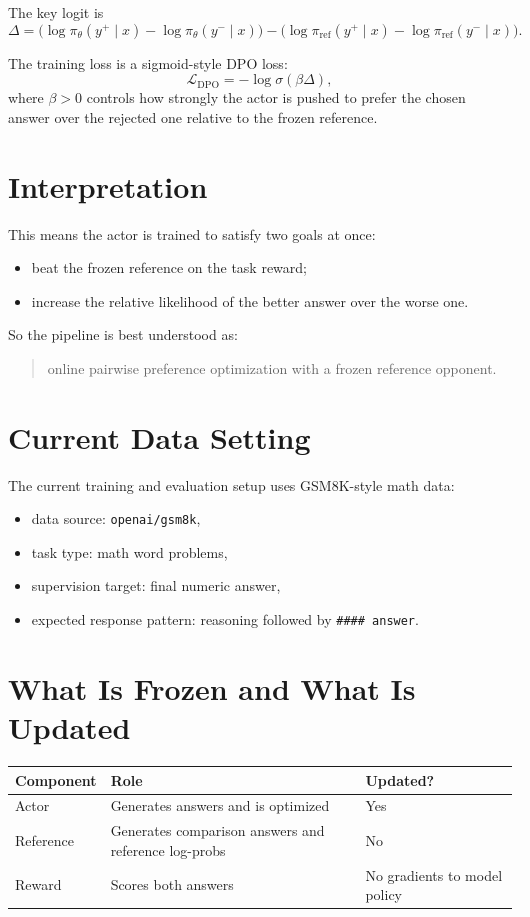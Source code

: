 \documentclass[11pt]{article}
\begin{document}
The key logit is
\[
\Delta =
\bigl(\log \pi_{\theta}(y^{+}\mid x) - \log \pi_{\theta}(y^{-}\mid x)\bigr)
-
\bigl(\log \pi_{\mathrm{ref}}(y^{+}\mid x) - \log \pi_{\mathrm{ref}}(y^{-}\mid x)\bigr).
\]

The training loss is a sigmoid-style DPO loss:
\[
\mathcal{L}_{\mathrm{DPO}}
=
- \log \sigma(\beta \Delta),
\]
where $\beta > 0$ controls how strongly the actor is pushed to prefer the
chosen answer over the rejected one relative to the frozen reference.

\section{Interpretation}

This means the actor is trained to satisfy two goals at once:
\begin{itemize}
  \item beat the frozen reference on the task reward;
  \item increase the relative likelihood of the better answer over the worse one.
\end{itemize}

So the pipeline is best understood as:
\begin{quote}
online pairwise preference optimization with a frozen reference opponent.
\end{quote}

\section{Current Data Setting}

The current training and evaluation setup uses GSM8K-style math data:
\begin{itemize}
  \item data source: \texttt{openai/gsm8k},
  \item task type: math word problems,
  \item supervision target: final numeric answer,
  \item expected response pattern: reasoning followed by \texttt{\#\#\#\# answer}.
\end{itemize}

\section{What Is Frozen and What Is Updated}

\begin{center}
\begin{tabular}{lll}
\toprule
Component & Role & Updated? \\
\midrule
Actor & Generates answers and is optimized & Yes \\
Reference & Generates comparison answers and reference log-probs & No \\
Reward & Scores both answers & No gradients to model policy \\
\bottomrule
\end{tabular}
\end{center}
\end{document}
